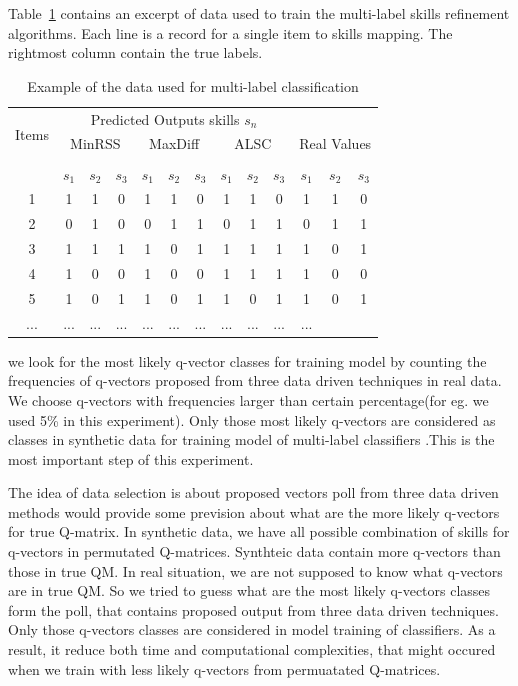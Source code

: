 \documentclass[11pt]{article}
\begin{document}
Table~\ref{ref:data} contains an excerpt of data used to train the multi-label skills refinement algorithms.  Each line is a record for a single item to skills mapping.
The rightmost column contain the true labels. 
\begin{table}
\centering
	\begin{tabular}{c|ccccccccc|ccc}	
\toprule
\multirow{3}{*}{Items} & \multicolumn{9}{c}{Predicted Outputs skills $s_n$}\\
\cmidrule{2-9}
& \multicolumn{3}{c}{ MinRSS } & \multicolumn{3}{c}{MaxDiff}&\multicolumn{3}{c|}{ALSC}& \multicolumn{3}{c}{Real Values} \\ \\
\cmidrule{2-9}
& $s_1$ & $s_2$ & $s_3$ & $s_1$ & $s_2$ & $s_3$ & $s_1$ & $s_2$ & $s_3$  & \textbf{$s_1$} & \textbf{$s_2$} & \textbf{$s_3$}\\ \hline

	1 & 1 & 1 & 0 & 1 & 1 & 0 & 1 & 1 & 0  & 1 & 1 & 0 \\
	2 & 0 & 1 & 0 & 0 & 1 & 1 & 0 & 1 & 1 & 0 & 1 & 1 \\
	3 & 1 & 1 & 1 & 1 & 0 & 1 &1 & 1 & 1 & 1 & 0 & 1\\
	4 & 1 & 0 & 0 & 1 & 0 & 0 & 1 & 1 & 1 & 1 & 0 & 0 \\
	5 & 1 & 0 & 1 & 1 & 0 & 1 & 1 & 0 & 1  & 1 & 0 & 1\\
	... &... &... &... &... &... &... &... &... &... &...\\
	 \hline\hline
       
	\end{tabular}

\caption{Example of the data used for multi-label classification} \label{ref:data} 
\end{table}



we look for the most likely q-vector classes for training model by counting the frequencies of q-vectors proposed from three data driven techniques in real data. We choose q-vectors with frequencies larger than certain percentage(for eg. we used 5\% in this experiment). Only those most likely q-vectors are considered as classes in synthetic data for training model of multi-label classifiers .This is the most important step of this experiment.


  The idea of data selection is about proposed vectors poll from three data driven methods would provide some prevision about what are the more likely q-vectors for true Q-matrix. In synthetic data, we have all possible combination of skills for q-vectors in permutated Q-matrices. Synthteic data contain more q-vectors than those in true QM. In real situation, we are not supposed to know what q-vectors are in true QM. So we tried to guess what are the most likely q-vectors classes form the poll, that contains proposed output from three data driven techniques. Only those q-vectors classes are considered in model training of classifiers. As a result, it reduce both time and computational complexities, that might occured when we train with less likely q-vectors from permuatated Q-matrices.   
\end{document}
